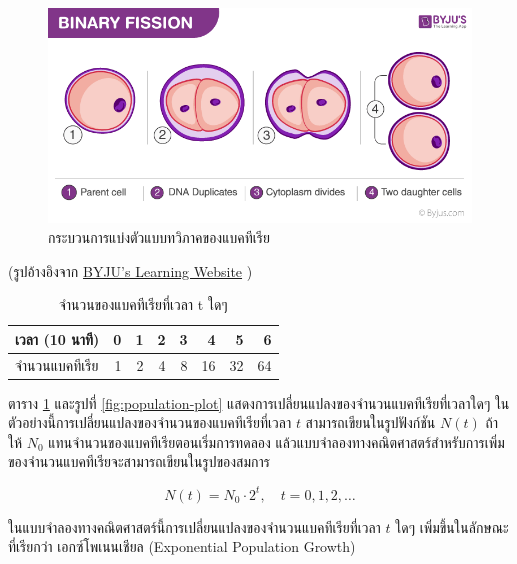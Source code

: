 \documentclass[
]{book}
\theoremstyle{definition}
\theoremstyle{definition}
\theoremstyle{definition}
\theoremstyle{definition}
\theoremstyle{remark}
\begin{document}
\begin{figure}
\includegraphics[width=1\linewidth]{images/fig-binary-fission} \caption{กระบวนการแบ่งตัวแบบทวิภาคของแบคทีเรีย}\label{fig:fig-binary-fission}
\end{figure}

(รูปอ้างอิงจาก \href{https://byjus.com/biology/binary-fission/}{BYJU's Learning Website} )

\begin{table}

\caption{\label{tab:bacteria-table}จำนวนของแบคทีเรียที่เวลา t ใดๆ}
\centering
\begin{tabular}[t]{l|r|r|r|r|r|r|r}
\hline
เวลา (10 นาที) & 0 & 1 & 2 & 3 & 4 & 5 & 6\\
\hline
จำนวนแบคทีเรีย & 1 & 2 & 4 & 8 & 16 & 32 & 64\\
\hline
\end{tabular}
\end{table}

ตาราง \ref{tab:bacteria-table} และรูปที่ \ref{fig:population-plot} แสดงการเปลี่ยนแปลงของจำนวนแบคทีเรียที่เวลาใดๆ ในตัวอย่างนี้การเปลี่ยนแปลงของจำนวนของแบคทีเรียที่เวลา \(t\) สามารถเขียนในรูปฟังก์ชัน \(N(t)\) ถ้าให้ \(N_0\) แทนจำนวนของแบคทีเรียตอนเริ่มการทดลอง แล้วแบบจำลองทางคณิตศาสตร์สำหรับการเพิ่มของจำนวนแบคทีเรียจะสามารถเขียนในรูปของสมการ

\begin{equation}
N(t) = N_0 \cdot 2 ^t, \quad t = 0,1,2, \ldots
\label{eq:population-growth}
\end{equation}

ในแบบจำลองทางคณิตศาสตร์นี้การเปลี่ยนแปลงของจำนวนแบคทีเรียที่เวลา \(t\) ใดๆ เพิ่มขึ้นในลักษณะที่เรียกว่า เอกซ์โพเนนเชียล (Exponential Population Growth)
\end{document}
